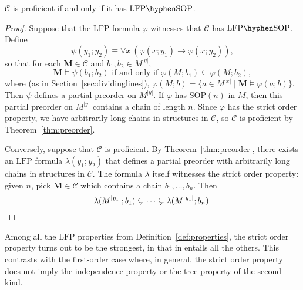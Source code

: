 \documentclass{lmcs}
\newcommand{\LFP}{\mathrm{LFP}}
\newcommand{\LFPP}[1]{\LFP\hyphen#1}
\newcommand{\SOP}{\mathrm{SOP}}
\newcommand{\M}{\mathbf{M}}
\theoremstyle{thmC}
\begin{document}
\begin{thm}\label{LFP-sOP=proficient}
$\mathcal{C}$ is proficient if and only if it has $\LFPP{\SOP}$.
\end{thm}
\begin{proof}

Suppose that the $\LFP$ formula $\varphi$ witnesses that  $\mathcal{C}$ has $\LFPP{\SOP}$. Define
\[
\psi(y_{1};y_{2})\equiv\forall x\ (\varphi(x;y_{1})\to\varphi(x;y_{2})),
\]
so that for each $\M\in\mathcal{C}$ and $b_1,b_2 \in M^{|y|}$, 
\[
\M\models\psi(b_1;b_2)\text{ if and only if }\varphi(M;b_1)\subseteq\varphi(M;b_2),
\]
where (as in Section~\ref{sec:dividinglines}),  $\varphi(M;b)=\{a \in M^{|x|} \mid \M \models \varphi(a;b)\}$. Then $\psi$ defines a partial preorder on $M^{|y|}$. If $\varphi$ has $\SOP(n)$ in $M$, then this partial preorder on $M^{|y|}$ contains a chain of length $n$. Since
$\varphi$ has the strict order property, we have arbitrarily long chains in structures in $\mathcal{C}$, so $\mathcal{C}$ is proficient by Theorem~\ref{thm:preorder}.

Conversely, suppose that $\mathcal{C}$ is proficient. By Theorem~\ref{thm:preorder}, there exists an $\LFP$ formula $\lambda(y_{1};y_{2})$ that defines a partial preorder with
arbitrarily long chains in structures in $\mathcal{C}$. The formula $\lambda$ itself
witnesses the strict order property: given $n$, pick $\M\in\mathcal{C}$
which contains a chain $b_{1},\dots,b_{n}$. Then 
\[
\lambda(M^{|y_{1}|};b_{1})\subsetneq\dots\subsetneq\lambda(M^{|y_{1}|};b_{n}).\qedhere
\]
\end{proof}


Among all the $\LFP$ properties from Definition~\ref{def:properties}, the strict order property turns out to be the strongest, in that in entails all the others. This contrasts with the first-order case where, in general, the strict order property does not imply the independence property or the tree property of the second kind.
\end{document}

